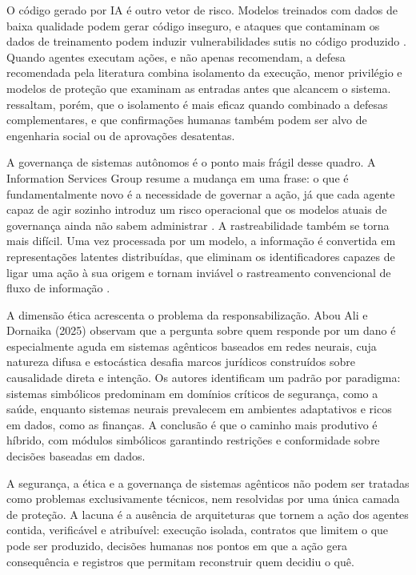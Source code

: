 O código gerado por IA é outro vetor de risco. Modelos treinados com dados de baixa qualidade podem gerar código inseguro, e ataques que contaminam os dados de treinamento podem induzir vulnerabilidades sutis no código produzido \cite{hou2024llm4se}. Quando agentes executam ações, e não apenas recomendam, a defesa recomendada pela literatura combina isolamento da execução, menor privilégio e modelos de proteção que examinam as entradas antes que alcancem o sistema.  ressaltam, porém, que o isolamento é mais eficaz quando combinado a defesas complementares, e que confirmações humanas também podem ser alvo de engenharia social ou de aprovações desatentas.

A governança de sistemas autônomos é o ponto mais frágil desse quadro. A Information Services Group resume a mudança em uma frase: o que é fundamentalmente novo é a necessidade de governar a ação, já que cada agente capaz de agir sozinho introduz um risco operacional que os modelos atuais de governança ainda não sabem administrar \cite{isg2025agentic}. A rastreabilidade também se torna mais difícil. Uma vez processada por um modelo, a informação é convertida em representações latentes distribuídas, que eliminam os identificadores capazes de ligar uma ação à sua origem e tornam inviável o rastreamento convencional de fluxo de informação \cite{chhabra2026security}.

A dimensão ética acrescenta o problema da responsabilização. Abou Ali e Dornaika (2025)\nocite{abouali2025agentic} observam que a pergunta sobre quem responde por um dano é especialmente aguda em sistemas agênticos baseados em redes neurais, cuja natureza difusa e estocástica desafia marcos jurídicos construídos sobre causalidade direta e intenção. Os autores identificam um padrão por paradigma: sistemas simbólicos predominam em domínios críticos de segurança, como a saúde, enquanto sistemas neurais prevalecem em ambientes adaptativos e ricos em dados, como as finanças. A conclusão é que o caminho mais produtivo é híbrido, com módulos simbólicos garantindo restrições e conformidade sobre decisões baseadas em dados.

A segurança, a ética e a governança de sistemas agênticos não podem ser tratadas como problemas exclusivamente técnicos, nem resolvidas por uma única camada de proteção. A lacuna é a ausência de arquiteturas que tornem a ação dos agentes contida, verificável e atribuível: execução isolada, contratos que limitem o que pode ser produzido, decisões humanas nos pontos em que a ação gera consequência e registros que permitam reconstruir quem decidiu o quê.

